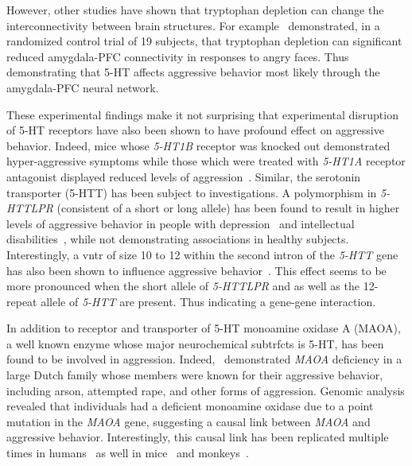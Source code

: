 However, other studies have shown that tryptophan depletion can change the interconnectivity between brain structures.
For example~\citet{Passamonti2012} demonstrated, in a randomized control trial of 19 subjects, that tryptophan depletion can significant reduced amygdala-PFC connectivity in responses to angry faces.
Thus demonstrating that 5-HT affects aggressive behavior most likely through the amygdala-PFC neural network.

These experimental findings make it not surprising that experimental disruption of 5-HT receptors have also been shown to have profound effect on aggressive behavior.  
Indeed, mice whose \textit{5-HT1B} receptor was knocked out demonstrated hyper-aggressive symptoms while those which were treated with \textit{5-HT1A} receptor antagonist displayed reduced levels of aggression~\cite{Saudou1994,Bell1994}.
Similar, the serotonin transporter (5-HTT) has been subject to investigations.
A polymorphism in \textit{5-HTTLPR} (consistent of a short or long allele)  has been found to result in higher levels of aggressive behavior in  people with depression~\cite{Gonda2011} and intellectual disabilities~\cite{May2010}, while not demonstrating associations in healthy subjects.
Interestingly, a \acrfull{vntr} of size 10 to 12 within the second intron of the \textit{5-HTT} gene has also been shown to influence aggressive behavior~\cite{Aluja2009}. 
This effect seems to be more pronounced when the short allele of \textit{5-HTTLPR} and as well as the 12-repeat allele of \textit{5-HTT} are present. 
Thus indicating a gene-gene interaction.

In addition to receptor and transporter of 5-HT monoamine oxidase A (MAOA), a well known enzyme whose major neurochemical subtrfcts is 5-HT, has been found to be involved in aggression.
Indeed,~\citet{Brunner1993} demonstrated \textit{MAOA} deficiency in a large  Dutch family whose members were known for their aggressive behavior, including arson, attempted rape, and other forms of aggression.
Genomic analysis revealed that individuals had a deficient monoamine oxidase due to a point mutation in the \textit{MAOA} gene, suggesting a causal link between \textit{MAOA} and aggressive behavior.
Interestingly, this causal link has been replicated multiple times in humans~\cite{Huang2004,Manuck2000} as well in mice~\cite{Cases1995} and monkeys~\cite{Newman2005}.

